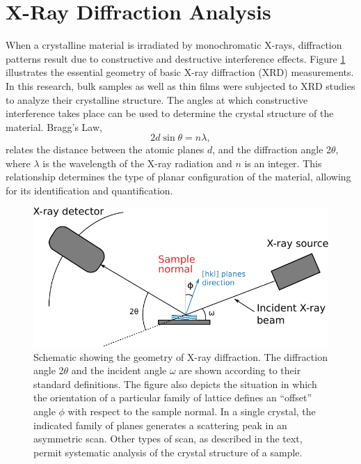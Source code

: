 \vspace{12pt}
\section{X-Ray Diffraction Analysis}

When a crystalline material is irradiated by monochromatic X-rays, diffraction patterns result due to constructive and destructive interference effects. Figure \ref{fig:XRD} illustrates the essential geometry of basic X-ray diffraction (XRD) measurements. In this research, bulk samples as well as thin films were subjected to XRD studies to analyze their crystalline structure. The angles at which constructive interference takes place can be used to determine the crystal structure of the material. Bragg’s Law, 
\begin{equation}
2 d \sin{\theta} = n \lambda,
\label{eq:bragg}
\end{equation}
relates the distance between the atomic planes $d$, and the diffraction angle 2$\theta$, where $\lambda$ is the wavelength of the X-ray radiation and $n$ is an integer. This relationship determines the type of planar configuration of the material, allowing for its identification and quantification.

\begin{figure}
\centering
\includegraphics{Figures/XRD-2.pdf}
\caption[Schematic of X-ray diffraction.]{Schematic showing the geometry of X-ray diffraction. The diffraction angle 2$\theta$ and the incident angle $\omega$ are shown according to their standard definitions. The figure also depicts the situation in which the orientation of a particular family of lattice defines an ``offset'' angle $\phi$ with respect to the sample normal. In a single crystal, the indicated family of planes generates a scattering peak in an asymmetric scan. Other types of scan, as described in the text, permit systematic analysis of the crystal structure of a sample.}
\label{fig:XRD}
\end{figure}

